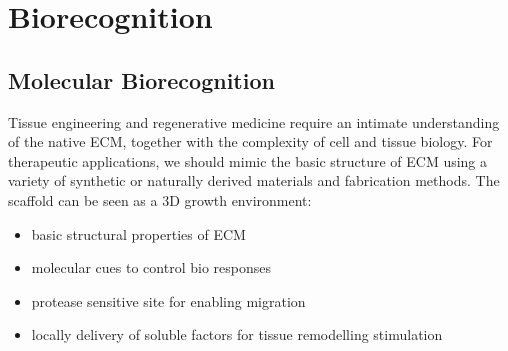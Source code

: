 \graphicspath{{chapters/biorecognition/}}
\chapter{Biorecognition}

\section{Molecular Biorecognition}
Tissue engineering and regenerative medicine require an intimate understanding of the native ECM, together with the complexity of cell and tissue biology. For therapeutic applications, we should mimic the basic structure of ECM using a variety of synthetic or naturally derived materials and fabrication methods.
The scaffold can be seen as a 3D growth environment:
\begin{itemize}
\item basic structural properties of ECM
\item molecular cues to control bio responses
\item protease sensitive site for enabling migration
\item locally delivery of soluble factors for tissue remodelling stimulation
\end{itemize}

